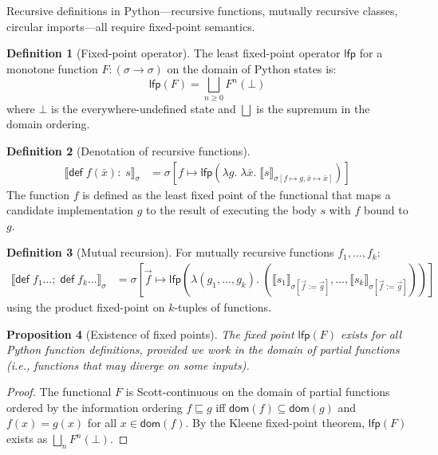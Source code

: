\documentclass[11pt,a4paper]{report}
\theoremstyle{definition}
\newtheorem{definition}{Definition}[chapter]
\theoremstyle{plain}
\newtheorem{proposition}[definition]{Proposition}
\newcommand{\den}[1]{\llbracket #1 \rrbracket}
\begin{document}
Recursive definitions in Python---recursive functions, mutually recursive
classes, circular imports---all require fixed-point semantics.

\begin{definition}[Fixed-point operator]
The least fixed-point operator $\mathsf{lfp}$ for a monotone function
$F : (\sigma \to \sigma)$ on the domain of Python states is:
\[
  \mathsf{lfp}(F) = \bigsqcup_{n \geq 0} F^n(\bot)
\]
where $\bot$ is the everywhere-undefined state and $\bigsqcup$ is the
supremum in the domain ordering.
\end{definition}

\begin{definition}[Denotation of recursive functions]
\begin{align}
  \den{\mathsf{def}\;f(\bar{x})\!:\;s}_\sigma
    &= \sigma\!\left[f \mapsto \mathsf{lfp}\!\left(
       \lambda g.\;\lambda \bar{x}.\;\den{s}_{\sigma[f \mapsto g, \bar{x} \mapsto \bar{x}]}
    \right)\right]
\end{align}
The function $f$ is defined as the least fixed point of the functional that
maps a candidate implementation $g$ to the result of executing the body $s$
with $f$ bound to $g$.
\end{definition}

\begin{definition}[Mutual recursion]
For mutually recursive functions $f_1, \ldots, f_k$:
\begin{align}
  \den{\mathsf{def}\;f_1\ldots; \;\mathsf{def}\;f_k\ldots}_\sigma
    &= \sigma\!\left[\vec{f} \mapsto \mathsf{lfp}\!\left(
       \lambda (g_1, \ldots, g_k).\;
       (\den{s_1}_{\sigma[\vec{f} := \vec{g}]}, \ldots,
        \den{s_k}_{\sigma[\vec{f} := \vec{g}]})
    \right)\right]
\end{align}
using the product fixed-point on $k$-tuples of functions.
\end{definition}

\begin{proposition}[Existence of fixed points]
The fixed point $\mathsf{lfp}(F)$ exists for all Python function definitions,
provided we work in the domain of \emph{partial functions} (i.e., functions
that may diverge on some inputs).
\end{proposition}
\begin{proof}
The functional $F$ is Scott-continuous on the domain of partial functions
ordered by the information ordering $f \sqsubseteq g$ iff
$\mathsf{dom}(f) \subseteq \mathsf{dom}(g)$ and $f(x) = g(x)$ for all
$x \in \mathsf{dom}(f)$.  By the Kleene fixed-point theorem, $\mathsf{lfp}(F)$
exists as $\bigsqcup_n F^n(\bot)$.
\end{proof}
\end{document}
